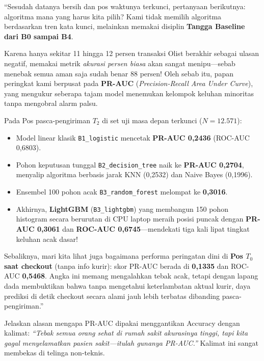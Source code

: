 \documentclass[11pt,a4paper,oneside]{book}
\newcommand{\code}[1]{{\small\nolinkurl{#1}}}
\begin{document}
\begin{scriptbox}
``Sesudah datanya bersih dan pos waktunya terkunci, pertanyaan berikutnya: algoritma mana yang harus kita pilih? Kami tidak memilih algoritma berdasarkan tren kata kunci, melainkan memakai disiplin \textbf{Tangga Baseline dari B0 sampai B4}.

Karena hanya sekitar 11 hingga 12 persen transaksi Olist berakhir sebagai ulasan negatif, memakai metrik \emph{akurasi persen biasa} akan sangat menipu---sebab menebak semua aman saja sudah benar 88 persen! Oleh sebab itu, papan peringkat kami berpusat pada \textbf{PR-AUC} (\emph{Precision-Recall Area Under Curve}), yang mengukur seberapa tajam model menemukan kelompok keluhan minoritas tanpa mengobral alarm palsu.

Pada Pos pasca-pengiriman $T_2$ di set uji masa depan terkunci ($N = 12.571$):
\begin{itemize}
  \item Model linear klasik \code{B1_logistic} mencetak \textbf{PR-AUC 0,2436} (ROC-AUC 0,6803).
  \item Pohon keputusan tunggal \code{B2_decision_tree} naik ke \textbf{PR-AUC 0,2704}, menyalip algoritma berbasis jarak KNN (0,2532) dan Naive Bayes (0,1996).
  \item Ensembel 100 pohon acak \code{B3_random_forest} melompat ke \textbf{0,3016}.
  \item Akhirnya, \textbf{LightGBM} (\code{B3_lightgbm}) yang membangun 150 pohon histogram secara berurutan di CPU laptop meraih posisi puncak dengan \textbf{PR-AUC 0,3061} dan \textbf{ROC-AUC 0,6745}---mendekati tiga kali lipat tingkat keluhan acak dasar!
\end{itemize}
Sebaliknya, mari kita lihat juga bagaimana performa peringatan dini di \textbf{Pos $T_0$ saat checkout} (tanpa info kurir): skor PR-AUC berada di \textbf{0,1335} dan ROC-AUC \textbf{0,5468}. Angka ini memang mengalahkan tebak acak, tetapi dengan lapang dada membuktikan bahwa tanpa mengetahui keterlambatan aktual kurir, daya prediksi di detik checkout secara alami jauh lebih terbatas dibanding pasca-pengiriman.''
\end{scriptbox}

\begin{tipbox}
Jelaskan alasan mengapa PR-AUC dipakai menggantikan Accuracy dengan kalimat: \emph{``Tebak semua orang sehat di rumah sakit akurasinya tinggi, tapi kita gagal menyelamatkan pasien sakit---itulah gunanya PR-AUC.''} Kalimat ini sangat membekas di telinga non-teknis.
\end{tipbox}
\end{document}
